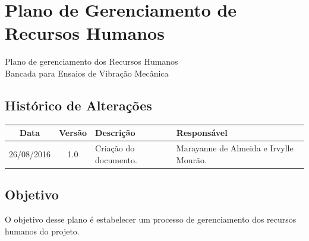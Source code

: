\chapter{Plano de Gerenciamento de Recursos Humanos}		   			\label{plano_de_rh}
% 	


\begin{center}
 {\large Plano de gerenciamento dos Recursos Humanos}\\[0.2cm]
 {Bancada para Ensaios de Vibração Mecânica}\\
 
 \end{center}
 
 \section*{Histórico de Alterações}
\begin{table}[h]
\centering
\begin{tabular}{|c|c|p{6cm}|p{5cm}|}
\hline
Data & Versão & Descrição & Responsável\\
\hline                               
26/08/2016 & 1.0 & Criação do documento. & Marayanne de Almeida e Irvylle Mourão.\\

\hline
\end{tabular}
\end{table}

\section*{Objetivo}
  O objetivo desse plano é estabelecer um processo de gerenciamento dos recursos humanos do projeto.
  
